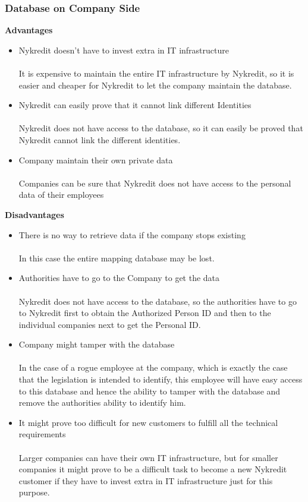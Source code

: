 \subsubsection{Database on Company Side}
\textbf{Advantages}
\begin{itemize}
	\item Nykredit doesn’t have to invest extra in IT infrastructure
	\\
	\\It is expensive to maintain the entire IT infrastructure by Nykredit, so it is easier and cheaper for Nykredit to let the company maintain the database.
	\item Nykredit can easily prove that it cannot link different Identities
	\\
	\\Nykredit does not have access to the database, so it can easily be proved that Nykredit cannot link the different identities.
	\item Company maintain their own private data
	\\
	\\Companies can be sure that Nykredit does not have access to the personal data of their employees
\end{itemize}
\textbf{Disadvantages}
\begin{itemize}
	
	\item There is no way to retrieve data if the company stops existing
	\\
	\\In this case the entire mapping database may be lost.
	\item Authorities have to go to the Company to get the data
	\\
	\\Nykredit does not have access to the database, so the authorities have to go to Nykredit first to obtain the Authorized Person ID and then to the individual companies next to get the Personal ID.
	\item Company might tamper with the database
	\\
	\\In the case of a rogue employee at the company, which is exactly the case that the legislation is intended to identify, this employee will have easy access to this database and hence the ability to tamper with the database and remove the authorities ability to identify him.
	\item It might prove too difficult for new customers to fulfill all the technical requirements 
	\\
	\\Larger companies can have their own IT infrastructure, but for smaller companies it might prove to be a difficult task to become a new Nykredit customer if they have to invest extra in IT infrastructure just for this purpose.
\end{itemize}

